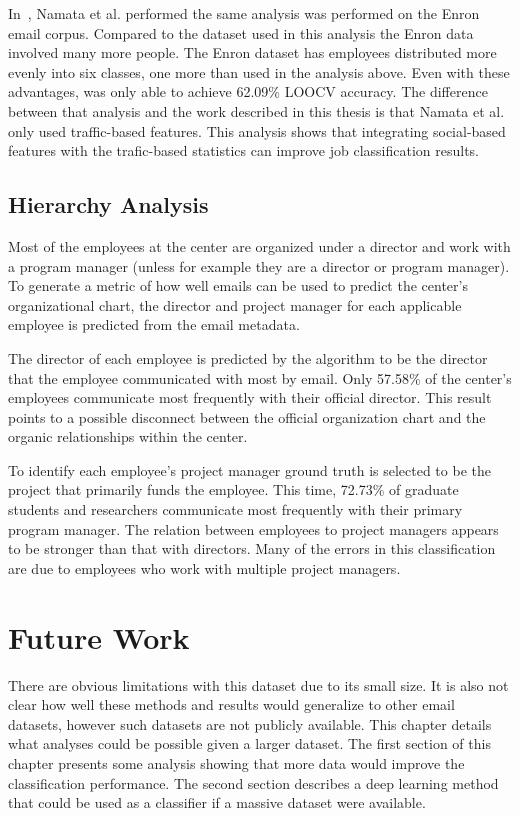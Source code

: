 \documentclass[12pt]{report}
\begin{document}
In~\cite{namata_inferring_2006}, Namata et al. performed the same analysis was performed on the Enron email corpus.
Compared to the dataset used in this analysis the Enron data involved many more people.
The Enron dataset has employees distributed more evenly into six classes, one more than used in the analysis above.
Even with these advantages, \cite{namata_inferring_2006} was only able to achieve 62.09\% LOOCV accuracy.
The difference between that analysis and the work described in this thesis is that Namata et al. only used traffic-based features.
This analysis shows that integrating social-based features with the trafic-based statistics can improve job classification results.

\section{Hierarchy Analysis}
Most of the employees at the center are organized under a director and work with a program manager (unless for example they are a director or program manager).
To generate a metric of how well emails can be used to predict the center's organizational chart, the director and project manager for each applicable employee is predicted from the email metadata. 

The director of each employee is predicted by the algorithm to be the director that the employee communicated with most by email.
Only 57.58\% of the center's employees communicate most frequently with their official director.
This result points to a possible disconnect between the official organization chart and the organic relationships within the center.

To identify each employee's project manager ground truth is selected to be the project that primarily funds the employee.
This time, 72.73\% of graduate students and researchers communicate most frequently with their primary program manager.
The relation between employees to project managers appears to be stronger than that with directors.
Many of the errors in this classification are due to employees who work with multiple project managers.  

\chapter{Future Work} \label{FutureWork}
There are obvious limitations with this dataset due to its small size.
It is also not clear how well these methods and results would generalize to other email datasets, however such datasets are not publicly available.
This chapter details what analyses could be possible given a larger dataset.
The first section of this chapter presents some analysis showing that more data would improve the classification performance.
The second section describes a deep learning method that could be used as a classifier if a massive dataset were available.
\end{document}
